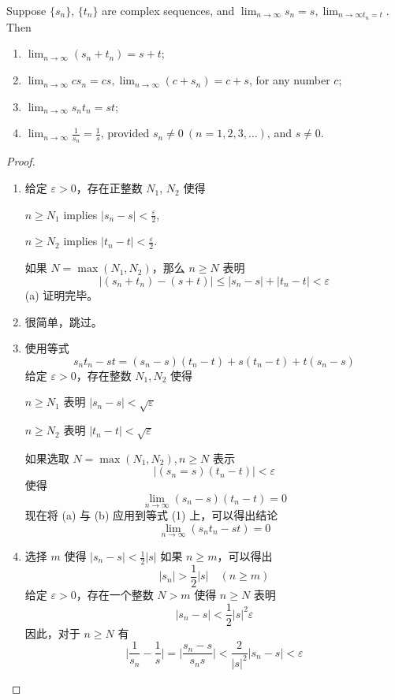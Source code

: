 \documentclass[../poma-notes.tex]{subfiles}
\begin{document}
\begin{theorem}
  Suppose $\{s_n\}$, $\{t_n\}$ are complex sequences, and $\lim_{n \to \infty} s_n = s,\lim_{n \to \infty t_n = t}$.
  Then
  \begin{enumerate}[label=(\alph*)]
    \item $\lim_{n \to \infty}(s_n + t_n) = s + t$;
    \item $\lim_{n \to \infty} cs_n = cs, \lim_{n \to \infty} (c + s_n) = c + s$, for any number $c$;
    \item $\lim_{n \to \infty} s_n t_n = st$;
    \item $\lim_{n \to \infty} \frac{1}{s_n} = \frac{1}{s}$, provided $s_n \ne 0\ (n=1,2,3,\dots)$, and $s \ne 0$.
  \end{enumerate}
\end{theorem}

\begin{proof}
  \begin{enumerate}[label=(\alph*)]
    \item 给定 $\varepsilon > 0$，存在正整数 $N_1$, $N_2$ 使得
          \begin{center}
            $n \ge N_1$ implies $|s_n - s| < \frac{\varepsilon}{2}$,
          \end{center}
          \begin{center}
            $n \ge N_2$ implies $|t_n - t| < \frac{\varepsilon}{2}$.
          \end{center}
          如果 $N = \max(N_1, N_2)$，那么 $n \ge N$ 表明
          \[|(s_n + t_n) - (s + t)| \le |s_n - s| + |t_n - t| < \varepsilon\]
          (a) 证明完毕。
    \item 很简单，跳过。
    \item 使用等式
          \begin{equation}
            s_n t_n - st = (s_n - s)(t_n - t) + s(t_n - t) + t(s_n - s)
          \end{equation}
          给定 $\varepsilon > 0$，存在整数 $N_1, N_2$ 使得
          \begin{center}
            $n \ge N_1$ 表明 $|s_n - s| < \sqrt{\varepsilon}$
          \end{center}
          \begin{center}
            $n \ge N_2$ 表明 $|t_n - t| < \sqrt{\varepsilon}$
          \end{center}
          如果选取 $N = \max (N_1, N_2), n \ge N$ 表示
          \[|(s_n = s)(t_n - t)| < \varepsilon\]
          使得
          \[\lim_{n \to \infty}(s_n - s)(t_n - t) = 0\]
          现在将 (a) 与 (b) 应用到等式 (1) 上，可以得出结论
          \[\lim_{n \to \infty}(s_n t_n - st) = 0\]
    \item 选择 $m$ 使得 $|s_n - s| < \frac{1}{2}|s|$ 如果 $n \ge m$，可以得出
          \[|s_n| > \frac{1}{2}|s| \quad (n \ge m)\]
          给定 $\varepsilon > 0$，存在一个整数 $N > m$ 使得 $n \ge N$ 表明
          \[|s_n - s| < \frac{1}{2}|s|^2 \varepsilon\]
          因此，对于 $n \ge N$ 有
          \[\biggl|\frac{1}{s_n}-\frac{1}{s}\biggr|=\biggl|\frac{s_n-s}{s_n s}\biggr|<\frac{2}{|s|^2}|s_n-s|<\varepsilon\]
  \end{enumerate}
\end{proof}
\end{document}
